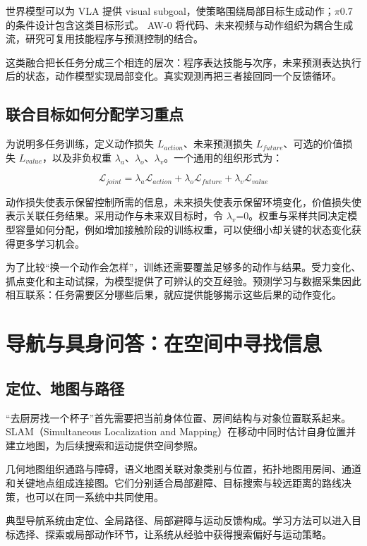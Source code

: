 \documentclass[UTF8,a4paper,11pt,oneside,openany,fontset=none]{ctexbook}
\begin{document}
世界模型可以为 VLA 提供 visual subgoal，使策略围绕局部目标生成动作；\(\pi\)0.7 的条件设计包含这类目标形式。\cite{R12} AW-0 将代码、未来视频与动作组织为耦合生成流，研究可复用技能程序与预测控制的结合。\cite{R31}

这类融合把长任务分成三个相连的层次：程序表达技能与次序，未来预测表达执行后的状态，动作模型实现局部变化。真实观测再把三者接回同一个反馈循环。

\section{联合目标如何分配学习重点}

为说明多任务训练，定义动作损失 \(L_{action}\)、未来预测损失 \(L_{future}\)、可选的价值损失 \(L_{value}\)，以及非负权重 \(\lambda _{a}\)、\(\lambda _{o}\)、\(\lambda _{v}\)。一个通用的组织形式为：

\[
\mathcal L_{joint}=\lambda_a\mathcal L_{action}+\lambda_o\mathcal L_{future}+\lambda_v\mathcal L_{value}
\]

动作损失使表示保留控制所需的信息，未来损失使表示保留环境变化，价值损失使表示关联任务结果。采用动作与未来双目标时，令 \(\lambda _{v}\)=0。权重与采样共同决定模型容量如何分配，例如增加接触阶段的训练权重，可以使细小却关键的状态变化获得更多学习机会。

为了比较``换一个动作会怎样''，训练还需要覆盖足够多的动作与结果。受力变化、抓点变化和主动试探，为模型提供了可辨认的交互经验。预测学习与数据采集因此相互联系：任务需要区分哪些后果，就应提供能够揭示这些后果的动作变化。

\chapter{导航与具身问答：在空间中寻找信息}

\section{定位、地图与路径}

``去厨房找一个杯子''首先需要把当前身体位置、房间结构与对象位置联系起来。SLAM（Simultaneous Localization and Mapping）在移动中同时估计自身位置并建立地图，为后续搜索和运动提供空间参照。

几何地图组织通路与障碍，语义地图关联对象类别与位置，拓扑地图用房间、通道和关键地点组成连接图。它们分别适合局部避障、目标搜索与较远距离的路线决策，也可以在同一系统中共同使用。

典型导航系统由定位、全局路径、局部避障与运动反馈构成。学习方法可以进入目标选择、探索或局部动作环节，让系统从经验中获得搜索偏好与运动策略。
\end{document}
